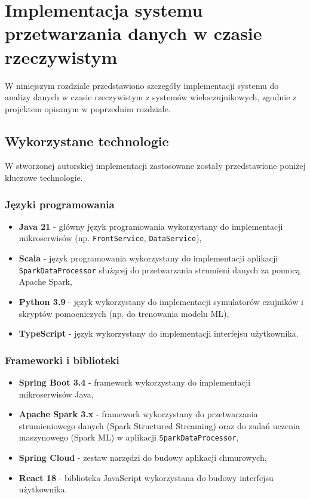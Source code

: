 \section{Implementacja systemu przetwarzania danych w czasie rzeczywistym}
\label{sec:implementacja_systemu}

W niniejszym rozdziale przedstawiono szczegóły implementacji systemu do analizy danych w czasie rzeczywistym z systemów wieloczujnikowych,
zgodnie z projektem opisanym w poprzednim rozdziale.

\subsection{Wykorzystane technologie}
\label{subsec:technologie}

W stworzonej autorskiej implementacji zastosowane zostały przedstawione poniżej kluczowe technologie.

\subsubsection{Języki programowania}
\label{subsubsec:jezyki_programowania}

\begin{itemize}
    \item \textbf{Java 21} - główny język programowania wykorzystany do implementacji mikroserwisów (np. \texttt{FrontService}, \texttt{DataService}),
    \item \textbf{Scala} - język programowania wykorzystany do implementacji aplikacji \texttt{SparkDataProcessor} służącej do przetwarzania strumieni danych za pomocą Apache Spark,
    \item \textbf{Python 3.9} - język wykorzystany do implementacji symulatorów czujników i skryptów pomocniczych (np. do trenowania modelu ML),
    \item \textbf{TypeScript} - język wykorzystany do implementacji interfejsu użytkownika.
\end{itemize}

\subsubsection{Frameworki i biblioteki}
\label{subsubsec:frameworki}

\begin{itemize}
    \item \textbf{Spring Boot 3.4} - framework wykorzystany do implementacji mikroserwisów Java,
    \item \textbf{Apache Spark 3.x} \cite{spark_streaming} - framework wykorzystany do przetwarzania strumieniowego danych (Spark Structured Streaming) oraz do zadań uczenia maszynowego (Spark ML) w aplikacji \texttt{SparkDataProcessor},
    \item \textbf{Spring Cloud} - zestaw narzędzi do budowy aplikacji chmurowych,
    \item \textbf{React 18} - biblioteka JavaScript wykorzystana do budowy interfejsu użytkownika.
\end{itemize}

